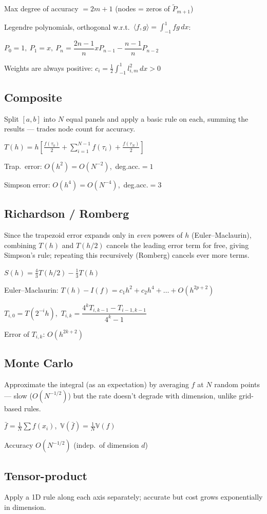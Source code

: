 \documentclass[11pt]{extarticle}
\begin{document}
Max degree of accuracy $=2m+1$ (nodes = zeros of $\tilde P_{m+1}$)

Legendre polynomials, orthogonal w.r.t.\ $\langle f,g\rangle=\int_{-1}^1fg\,dx$:

$P_0=1,\ P_1=x,\ P_n=\dfrac{2n-1}{n}xP_{n-1}-\dfrac{n-1}{n}P_{n-2}$

Weights are always positive: $c_i=\tfrac12\int_{-1}^1 l_{i,m}^2\,dx>0$

\subsection{Composite}
Split $[a,b]$ into $N$ equal panels and apply a basic rule on each, summing the results --- trades node count for accuracy.

$T(h)=h\!\left[\tfrac{f(\tau_0)}2{+}\!\!\sum_{i=1}^{N-1}\!f(\tau_i){+}\tfrac{f(\tau_N)}2\right]$

Trap.\ error: $O(h^2)=O(N^{-2})$,\ deg.acc.$=1$

Simpson error: $O(h^4)=O(N^{-4})$,\ deg.acc.$=3$

\subsection{Richardson / Romberg}
Since the trapezoid error expands only in \emph{even} powers of $h$ (Euler--Maclaurin), combining $T(h)$ and $T(h/2)$ cancels the leading error term for free, giving Simpson's rule; repeating this recursively (Romberg) cancels ever more terms.

$S(h)=\tfrac43T(h/2)-\tfrac13T(h)$

Euler--Maclaurin: $T(h)-I(f)=c_1h^2+c_2h^4+\dots+O(h^{2p+2})$

$T_{i,0}=T(2^{-i}h)$,\ $T_{i,k}=\dfrac{4^kT_{i,k-1}-T_{i-1,k-1}}{4^k-1}$

Error of $T_{i,k}$: $O(h^{2k+2})$

\subsection{Monte Carlo}
Approximate the integral (as an expectation) by averaging $f$ at $N$ random points --- slow ($O(N^{-1/2})$) but the rate doesn't degrade with dimension, unlike grid-based rules.

$\bar f=\tfrac1N\sum f(x_i)$,\ $\mathbb V(\bar f)=\tfrac1N\mathbb V(f)$

Accuracy $O(N^{-1/2})$ (indep.\ of dimension $d$)

\subsection{Tensor-product}
Apply a 1D rule along each axis separately; accurate but cost grows exponentially in dimension.
\end{document}
